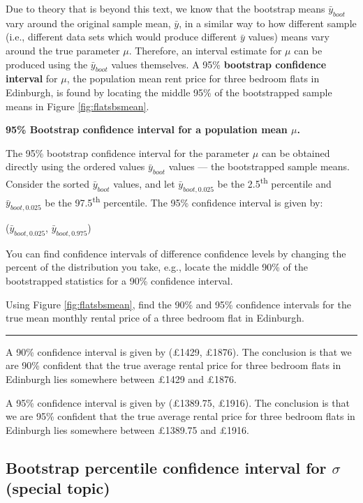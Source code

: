 \documentclass[
  10pt,
  openany]{book}
\theoremstyle{definition}
\theoremstyle{definition}
\theoremstyle{definition}
\theoremstyle{definition}
\theoremstyle{remark}
\begin{document}
Due to theory that is beyond this text, we know that the bootstrap means \(\bar{y}_{boot}\) vary around the original sample mean, \(\bar{y}\), in a similar way to how different sample (i.e., different data sets which would produce different \(\bar{y}\) values) means vary around the true parameter \(\mu\).
Therefore, an interval estimate for \(\mu\) can be produced using the \(\bar{y}_{boot}\) values themselves. A 95\% \textbf{bootstrap confidence interval} for \(\mu\), the population mean rent price for three bedroom flats in Edinburgh, is found by locating the middle 95\% of the bootstrapped sample means in Figure \ref{fig:flatsbsmean}.

\textbf{95\% Bootstrap confidence interval for a population mean \(\mu\).}

The 95\% bootstrap confidence interval for the parameter \(\mu\) can be obtained directly using the ordered values \(\bar{y}_{boot}\) values --- the bootstrapped sample means. Consider the sorted \(\bar{y}_{boot}\) values, and let \(\bar{y}_{boot, 0.025}\) be the 2.5\textsuperscript{th} percentile and \(\bar{y}_{boot, 0.025}\) be the 97.5\textsuperscript{th} percentile. The 95\% confidence interval is given by:

(\(\bar{y}_{boot, 0.025}\), \(\bar{y}_{boot, 0.975}\))

You can find confidence intervals of difference confidence levels by changing the percent of the distribution you take, e.g., locate the middle 90\% of the bootstrapped statistics for a 90\% confidence interval.

Using Figure \ref{fig:flatsbsmean}, find the 90\% and 95\% confidence intervals for the true mean monthly rental price of a three bedroom flat in Edinburgh.

\begin{center}\rule{0.5\linewidth}{0.5pt}\end{center}

A 90\% confidence interval is given by (£1429, £1876). The conclusion is that we are 90\% confident that the true average rental price for three bedroom flats in Edinburgh lies somewhere between £1429 and £1876.

A 95\% confidence interval is given by (£1389.75, £1916). The conclusion is that we are 95\% confident that the true average rental price for three bedroom flats in Edinburgh lies somewhere between £1389.75 and £1916.

\subsection{\texorpdfstring{Bootstrap percentile confidence interval for \(\sigma\) (special topic)}{Bootstrap percentile confidence interval for \textbackslash sigma (special topic)}}\label{bootstrap-percentile-confidence-interval-for-sigma-special-topic}
\end{document}
